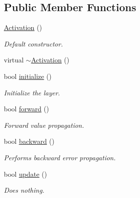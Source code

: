 \subsection*{Public Member Functions}
\begin{DoxyCompactItemize}
\item 
\hyperlink{classffnn_1_1layer_1_1_activation_a433d57370b979f91679e2065c48663f9}{Activation} ()
\begin{DoxyCompactList}\small\item\em Default constructor. \end{DoxyCompactList}\item 
virtual \hyperlink{classffnn_1_1layer_1_1_activation_a4b353acb2031fff2e7a15cf0895d346d}{$\sim$\-Activation} ()
\item 
bool \hyperlink{classffnn_1_1layer_1_1_activation_ae73ef2d36d9c5ce3c219f6a51cba3c35}{initialize} ()
\begin{DoxyCompactList}\small\item\em Initialize the layer. \end{DoxyCompactList}\item 
bool \hyperlink{classffnn_1_1layer_1_1_activation_aa7f88c8bc20589dc51d9dd615b8c4580}{forward} ()
\begin{DoxyCompactList}\small\item\em Forward value propagation. \end{DoxyCompactList}\item 
bool \hyperlink{classffnn_1_1layer_1_1_activation_a3c4284245343f2132dd28eaf7ffbed47}{backward} ()
\begin{DoxyCompactList}\small\item\em Performs backward error propagation. \end{DoxyCompactList}\item 
bool \hyperlink{classffnn_1_1layer_1_1_activation_a24a044458729f72466af06153851f5b2}{update} ()
\begin{DoxyCompactList}\small\item\em Does nothing. \end{DoxyCompactList}\end{DoxyCompactItemize}
